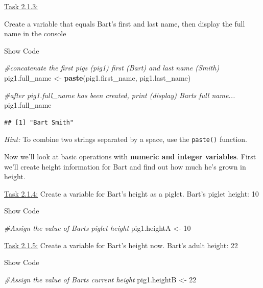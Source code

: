 \documentclass[
]{article}
\newenvironment{Shaded}{\begin{snugshade}}{\end{snugshade}}
\newcommand{\CommentTok}[1]{\textcolor[rgb]{0.56,0.35,0.01}{\textit{#1}}}
\newcommand{\DecValTok}[1]{\textcolor[rgb]{0.00,0.00,0.81}{#1}}
\newcommand{\FunctionTok}[1]{\textcolor[rgb]{0.13,0.29,0.53}{\textbf{#1}}}
\newcommand{\NormalTok}[1]{#1}
\newcommand{\OtherTok}[1]{\textcolor[rgb]{0.56,0.35,0.01}{#1}}
\begin{document}
\ul{Task 2.1.3:}

Create a variable that equals Bart's first and last name, then display
the full name in the console

Show Code

\begin{Shaded}
\begin{Highlighting}[]
\CommentTok{\#concatenate the first pig\textquotesingle{}s (pig1) first (\textquotesingle{}Bart\textquotesingle{}) and last name (\textquotesingle{}Smith\textquotesingle{})}
\NormalTok{pig1.full\_name }\OtherTok{\textless{}{-}} \FunctionTok{paste}\NormalTok{(pig1.first\_name, pig1.last\_name)}

\CommentTok{\#after pig1.full\_name has been created, print (display) Bart\textquotesingle{}s full name...}
\NormalTok{pig1.full\_name}
\end{Highlighting}
\end{Shaded}

\begin{verbatim}
## [1] "Bart Smith"
\end{verbatim}

\emph{Hint:} To combine two strings separated by a space, use the
\texttt{paste()} function.

Now we'll look at basic operations with \textbf{numeric and integer
variables}. First we'll create height information for Bart and find out
how much he's grown in height.

\ul{Task 2.1.4:} Create a variable for Bart's height as a piglet.
\textbar{} Bart's piglet height: 10

Show Code

\begin{Shaded}
\begin{Highlighting}[]
\CommentTok{\#Assign the value of Bart\textquotesingle{}s piglet height}
\NormalTok{pig1.heightA }\OtherTok{\textless{}{-}} \DecValTok{10}
\end{Highlighting}
\end{Shaded}

\ul{Task 2.1.5:} Create a variable for Bart's height now. \textbar{}
Bart's adult height: 22

Show Code

\begin{Shaded}
\begin{Highlighting}[]
\CommentTok{\#Assign the value of Bart\textquotesingle{}s current height}
\NormalTok{pig1.heightB }\OtherTok{\textless{}{-}} \DecValTok{22}
\end{Highlighting}
\end{Shaded}
\end{document}
